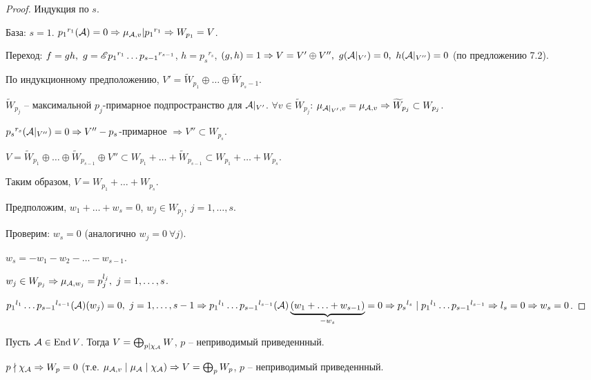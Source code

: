 \documentclass[main]{subfiles}
\begin{document}
\begin{proof}
    Индукция по $s$.

    База: $s = 1$. ${p_1}^{r_1}(\mathcal{A}) = 0 \Rightarrow \mu_{\mathcal{A}, v} | {p_1}^{r_1} \Rightarrow W_{p_1} = V$.

    Переход: $f = gh, \ g = \mathscr{E} {p_1}^{r_1} \ldots {p_{s-1}}^{r_{s-1}}$, $h = {p_s}^{r_s}$, $(g, h) = 1 \Rightarrow
        V = V' \oplus V'', \ g(\mathcal{A} |_{V'}) = 0, \ h(\mathcal{A} |_{V''}) = 0$ (по предложению 7.2).

    По индукционному предположению, $V' =  \widetilde{W}_{p_1} \oplus \ldots \oplus \widetilde{W}_{p_s-1}$.

    $\widetilde{W}_{p_j}$ -- максимальной $p_j$-примарное подпространство для $\mathcal{A} |_{V'}$.
    $\forall v \in \widetilde{W}_{p_j}$: $\mu_{\mathcal{A} |_{V'}, v} = \mu_{\mathcal{A}, v} \Rightarrow \widetilde{W}_{p_j} \subset W_{p_j}$.

    ${p_s}^{r_s}(\mathcal{A} |_{V''}) = 0 \Rightarrow V'' - p_s$-примарное $ \Rightarrow
        V'' \subset W_{p_s}$.

    $V = \widetilde{W}_{p_1} \oplus \ldots \oplus \widetilde{W}_{p_{s-1}} \oplus V'' \subset W_{p_1} + \ldots + \widetilde{W}_{p_{s-1}} \subset W_{p_1} + \ldots + W_{p_s}$.

    Таким образом, $V = W_{p_1} + \ldots + W_{p_s}$.

    Предположим, $w_1 + \ldots + w_s = 0$, $w_j \in W_{p_j}, \ j = 1, \ldots, s$.

    Проверим: $w_s = 0$ (аналогично $w_j = 0 \ \forall j)$.

    $w_s = - w_1 - w_2 - \ldots - w_{s-1}$.

    $w_j \in W_{p_j} \Rightarrow \mu_{\mathcal{A}, w_j} = p_j^{l_j}, \ j = 1, \ldots, s$.

    ${p_1}^{l_1} \ldots {p_{s-1}}^{l_{s-1}} (\mathcal{A}) (w_j) = 0, \ j = 1, \ldots, s-1 \Rightarrow
        {p_1}^{l_1} \ldots {p_{s-1}}^{l_{s-1}} (\mathcal{A}) \underbrace{(w_1 + \ldots + w_{s-1})}_{-w_s} = 0  \Rightarrow
        {p_s}^{l_s} \mid {p_1}^{l_1} \ldots {p_{s-1}}^{l_{s-1}} \Rightarrow l_s = 0 \Rightarrow w_s = 0$.
\end{proof}

\begin{corollary}
    Пусть $\mathcal{A} \in \operatorname{End} V$. Тогда $V = \bigoplus_{p|\chi_{\mathcal{A}}} W$, $p$ -- неприводимый приведеннный.
\end{corollary}

\begin{remark}
    $p \nmid \chi_{\mathcal{A}} \Rightarrow W_p = 0$ (т.е. $\mu_{\mathcal{A}, v} \mid \mu_{\mathcal{A}} \mid \chi_{\mathcal{A}}) \Rightarrow V = \bigoplus_p W_p$, $p$ -- неприводимый приведеннный.
\end{remark}
\end{document}
